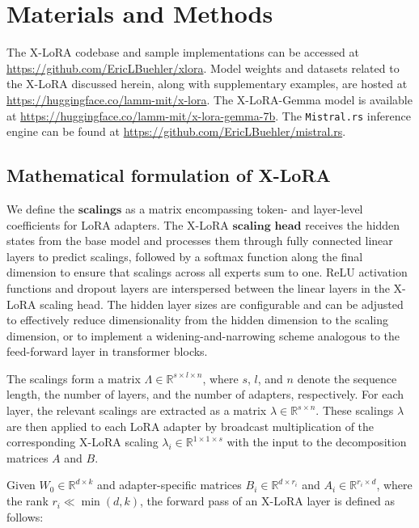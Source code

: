 \section{Materials and Methods}

The X-LoRA codebase and sample implementations can be accessed at \url{https://github.com/EricLBuehler/xlora}. Model weights and datasets related to the X-LoRA discussed herein, along with supplementary examples, are hosted at \url{https://huggingface.co/lamm-mit/x-lora}. The X-LoRA-Gemma model is available at \url{https://huggingface.co/lamm-mit/x-lora-gemma-7b}. The \texttt{Mistral.rs} inference engine can be found at \url{https://github.com/EricLBuehler/mistral.rs}.

\subsection{Mathematical formulation of X-LoRA} We define the $\mathbf{scalings}$ as a matrix encompassing token- and layer-level coefficients for LoRA adapters. The X-LoRA $\mathbf{scaling}$ $\mathbf{head}$ receives the hidden states from the base model and processes them through fully connected linear layers to predict scalings, followed by a softmax function along the final dimension to ensure that scalings across all experts sum to one. ReLU activation functions and dropout layers are interspersed between the linear layers in the X-LoRA scaling head. The hidden layer sizes are configurable and can be adjusted to effectively reduce dimensionality from the hidden dimension to the scaling dimension, or to implement a widening-and-narrowing scheme analogous to the feed-forward layer in transformer blocks.

The scalings form a matrix $\Lambda \in \mathbb{R}^{s \times l \times n}$, where $s$, $l$, and $n$ denote the sequence length, the number of layers, and the number of adapters, respectively. For each layer, the relevant scalings are extracted as a matrix $\lambda \in \mathbb{R}^{s \times n}$. These scalings $\lambda$ are then applied to each LoRA adapter by broadcast multiplication of the corresponding X-LoRA scaling $\lambda_i \in \mathbb{R}^{1 \times 1 \times s}$ with the input to the decomposition matrices $A$ and $B$.

Given $W_0 \in \mathbb{R}^{d \times k}$ and adapter-specific matrices $B_i \in \mathbb{R}^{d \times r_i}$ and $A_i \in \mathbb{R}^{r_i \times d}$, where the rank $r_i \ll \min(d,k)$, the forward pass of an X-LoRA layer is defined as follows:

